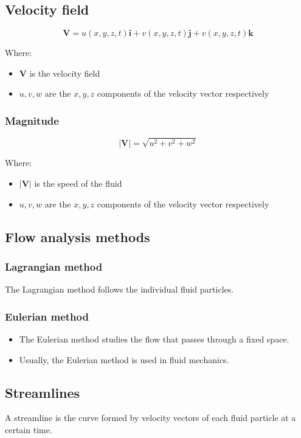 \documentclass[11pt]{article}
\begin{document}
\subsection{Velocity field}
\label{sec:orgde7bb48}
\[\boldsymbol{V} = u(x, y, z, t) \boldsymbol{i} + v(x, y, z, t) \boldsymbol{j} + v(x, y, z, t) \boldsymbol{k}\]

Where:
\begin{itemize}
\item \(\boldsymbol{V}\) is the velocity field
\item \(u, v, w\) are the \(x, y, z\) components of the velocity vector respectively
\end{itemize}
\subsubsection{Magnitude}
\label{sec:org7e64512}
\[\left| \boldsymbol{V} \right| = \sqrt{u^2 + v^2 + w^2}\]

Where:
\begin{itemize}
\item \(\left| \boldsymbol{V} \right|\) is the speed of the fluid
\item \(u, v, w\) are the \(x, y, z\) components of the velocity vector respectively
\end{itemize}
\subsection{Flow analysis methods}
\label{sec:org795d91a}

\subsubsection{Lagrangian method}
\label{sec:org46dc7df}
The Lagrangian method follows the individual fluid particles.
\subsubsection{Eulerian method}
\label{sec:org18e0890}
\begin{itemize}
\item The Eulerian method studies the flow that passes through a fixed space.
\item Usually, the Eulerian method is used in fluid mechanics.
\end{itemize}
\subsection{Streamlines}
\label{sec:org1b3897e}
A streamline is the curve formed by velocity vectors of each fluid particle at a certain time.
\end{document}
